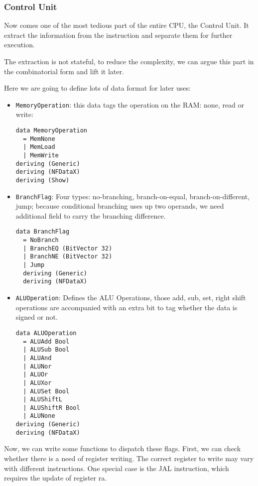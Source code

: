 \subsubsection{Control Unit}
Now comes one of the most tedious part of the entire CPU, the Control Unit. It extract the information from the instruction and separate them for further execution.

The extraction is not stateful, to reduce the complexity, we can argue this part in the combinatorial form and lift it later. 

Here we are going to define lots of data format for later uses:
 
\begin{itemize}
	\item \texttt{MemoryOperation}: this data tags the operation on the RAM: none, read or write:
	\begin{verbatim}
data MemoryOperation
  = MemNone
  | MemLoad
  | MemWrite
deriving (Generic)
deriving (NFDataX)
deriving (Show)
	\end{verbatim}
	\item \texttt{BranchFlag}: Four types: no-branching, branch-on-equal, branch-on-different, jump; because conditional branching uses up two operands, we need additional field to carry the branching difference.
\begin{verbatim}
data BranchFlag
  = NoBranch
  | BranchEQ (BitVector 32)
  | BranchNE (BitVector 32)
  | Jump
  deriving (Generic)
  deriving (NFDataX)
	\end{verbatim}
  \item \texttt{ALUOperation}: Defines the ALU Operations, those add, sub, set, right shift operations are accompanied with an extra bit to tag whether the data is signed or not.
\begin{verbatim}
data ALUOperation
  = ALUAdd Bool
  | ALUSub Bool
  | ALUAnd
  | ALUNor
  | ALUOr
  | ALUXor
  | ALUSet Bool
  | ALUShiftL
  | ALUShiftR Bool
  | ALUNone
deriving (Generic)
deriving (NFDataX)
	\end{verbatim}
\end{itemize}
Now, we can write some functions to dispatch these flags. First, we can check whether there is a need of register writing. The correct register to write may vary with different instructions. One special case is the JAL instruction, which requires the update of register ra.

